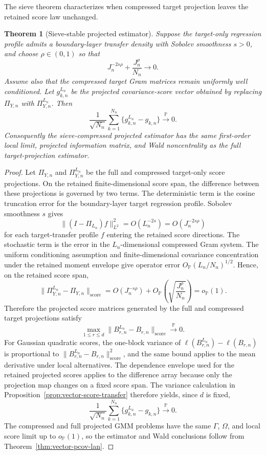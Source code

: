 \documentclass[11pt,a4paper]{amsart}
\theoremstyle{plain}
\newtheorem{theorem}{Theorem}[section]
\theoremstyle{definition}
\theoremstyle{remark}
\newcommand{\PP}{\mathbb{P}}
\newcommand{\toP}{\xrightarrow{\PP}}
\begin{document}
The sieve theorem characterizes when compressed target projection leaves the retained score law
unchanged.

\begin{theorem}[Sieve-stable projected estimator]\label{thm:sieve-pcov}
Suppose the target-only regression profile admits a boundary-layer transfer density with Sobolev
smoothness \(s>0\), and choose \(\rho\in(0,1)\) so that
\[
        J_n^{-2s\rho}+\frac{J_n^\rho}{N_n}\to0.
\]
Assume also that the compressed target Gram matrices remain uniformly well conditioned.  Let
\(g_{k,n}^{L_n}\) be the projected covariance-score vector obtained by replacing
\(\Pi_{Y,n}\) with \(\Pi_{Y,n}^{L_n}\).  Then
\[
        \frac1{\sqrt{N_n}}\sum_{k=1}^{N_n}
        \{g_{k,n}^{L_n}-g_{k,n}\}
        \toP 0.
\]
Consequently the sieve-compressed projected estimator has the same first-order local limit,
projected information matrix, and Wald noncentrality as the full target-projection estimator.
\end{theorem}

\begin{proof}
Let \(\Pi_{Y,n}\) and \(\Pi_{Y,n}^{L_n}\) be the full and compressed target-only score projections.
On the retained finite-dimensional score span, the difference between these projections is governed
by two terms.  The deterministic term is the cosine truncation error for the boundary-layer target
regression profile.  Sobolev smoothness \(s\) gives
\[
        \|(I-\Pi_{L_n})f\|_{L^2}^2
        =
        O(L_n^{-2s})
        =
        O(J_n^{-2s\rho})
\]
for each target-transfer profile \(f\) entering the retained score directions.  The stochastic term
is the error in the \(L_n\)-dimensional compressed Gram system.  The uniform conditioning assumption
and finite-dimensional covariance concentration under the retained moment envelope give operator
error \(O_{\PP}(L_n/N_n)^{1/2}\).  Hence, on the retained score span,
\[
        \|\Pi_{Y,n}^{L_n}-\Pi_{Y,n}\|_{\mathrm{score}}
        =
        O(J_n^{-s\rho})
        +
        O_{\PP}\!\left(\sqrt{\frac{J_n^\rho}{N_n}}\right)
        =
        o_{\PP}(1).
\]
Therefore the projected score matrices generated by the full and compressed target projections
satisfy
\[
        \max_{1\le r\le d}
        \|B_{r,n}^{L_n}-B_{r,n}\|_{\mathrm{score}}
        \toP 0.
\]
For Gaussian quadratic scores, the one-block variance of
\(\ell(B_{r,n}^{L_n})-\ell(B_{r,n})\) is proportional to
\(\|B_{r,n}^{L_n}-B_{r,n}\|_{\mathrm{score}}^2\), and the same bound applies to the mean derivative
under local alternatives.  The dependence envelope used for the retained projected scores applies
to the difference array because only the projection map changes on a fixed score span.  The
variance calculation in Proposition~\ref{prop:vector-score-transfer} therefore yields, since \(d\)
is fixed,
\[
        \frac1{\sqrt{N_n}}\sum_{k=1}^{N_n}
        \{g_{k,n}^{L_n}-g_{k,n}\}
        \toP 0.
\]
The compressed and full projected GMM problems have the same \(\Gamma\), \(\Omega\), and local score
limit up to \(o_{\PP}(1)\), so the estimator and Wald conclusions follow from
Theorem~\ref{thm:vector-pcov-lan}.
\end{proof}
\end{document}
